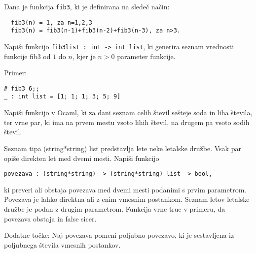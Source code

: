 \begin{ex}
  Dana je funkcija \lstinline{fib3}, ki je definirana na slede\v c na\v cin:
\begin{lstlisting}
  fib3(n) = 1, za n=1,2,3
  fib3(n) = fib3(n-1)+fib3(n-2)+fib3(n-3), za n>3.
\end{lstlisting}

  Napi\v si funkcijo 
  \lstinline{fib3list : int -> int list}, ki generira seznam
  vrednosti funkcije fib3 od $1$ do $n$, kjer je $n>0$ parameter funkcije.

\noindent\/Primer:
\begin{lstlisting}
# fib3 6;;
_ : int list = [1; 1; 1; 3; 5; 9]
\end{lstlisting}

%
%
%

\end{ex} 
\begin{ex}
Napi\v si funkcijo v Ocaml, ki za dani seznam celih \v stevil se\v steje soda in liha \v stevila, ter vrne par, ki ima na prvem mestu vsoto lihih \v stevil, na drugem pa vsoto sodih \v stevil.

\end{ex} 
\begin{ex}
  Seznam tipa (string*string) list predstavlja lete neke letalske
  dru\v zbe. Vsak par opi\v se direkten let med dvemi mesti. Napi\v si
  funkcijo

\begin{lstlisting}
povezava : (string*string) -> (string*string) list -> bool,
\end{lstlisting}

  ki preveri ali obstaja povezava med dvemi mesti podanimi s prvim
  parametrom. Povezava je lahko direktna ali z enim vmesnim
  postankom. Seznam letov letalske dru\v zbe je podan z drugim
  parametrom. Funkcija vrne true v primeru, da povezava obstaja in
  false sicer.

  Dodatne to\v cke: Naj povezava pomeni poljubno povezavo, ki je
  sestavljena iz poljubnega \v stevila vmesnih postankov.


\end{ex} 
